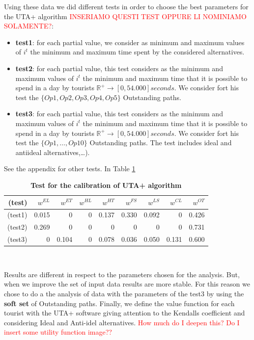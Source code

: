 \documentclass[a4paper]{article}
\begin{document}
Using these data we did different tests in order to choose the best parameters for the UTA+ algorithm \textcolor{red}{INSERIAMO QUESTI TEST OPPURE LI NOMINIAMO SOLAMENTE?}:
\begin{itemize}
    \item\textbf{test1}: for each partial value, we consider as minimum and maximum values of $i^t$ the minimum and maximum time spent by the considered alternatives.
    \item\textbf{test2}: for each partial value, this test considers as the minimum and maximum values of $i^t$ the minimum and maximum time that it is possible to spend in a day by tourists ${\mathbb{R}^+} \rightarrow [0,54.000] seconds$. We consider fort his test the $\{Op1, Op2, Op3, Op4, Op5\}$ Outstanding paths.
    \item\textbf{test3}: for each partial value, this test considers as the minimum and maximum values of $i^t$ the minimum and maximum time that it is possible to spend in a day by tourists ${\mathbb{R}^+} \rightarrow [0,54.000] seconds$. We consider fort his test the $\{Op1, \dots, Op10\}$ Outstanding paths. The test includes ideal and antiideal alternatives,\dots).
    \end{itemize}

 See the appendix for other tests.
 In Table \ref{Table4}


\begin{table}[ht]
\centering
\begin{tabular}{rrrrrrrrr}
  \hline
(test) & $w^{EL}$ & $w^{ET}$ & $w^{HL}$ & $w^{HT}$ & $w^{FS}$ & $w^{LS}$ & $w^{CL}$ & $w^{OT}$ \\
    \hline
(test1) & 0.015 & 0 & 0 & 0.137 & 0.330 & 0.092 & 0 & 0.426 \\
(test2) & 0.269 & 0 & 0 & 0 & 0 & 0 & 0 & 0.731 \\
(test3) & 0 & 0.104 & 0 & 0.078 & 0.036 & 0.050 & 0.131 & 0.600 \\
\hline
\end{tabular}
\caption{\textbf{Test for the calibration of UTA+ algorithm}}\
\label{Table4}
\end{table}

Results are different in respect to the parameters chosen for the analysis. But, when we improve the set of input data results are more stable. For this reason we chose to do a the analysis of data with the parameters of the test3 by using the \textbf{soft set} of Outstanding paths.
Finally, we define the value function for each tourist with the UTA+ software giving attention to the Kendalls coefficient and considering Ideal and Anti-idel alternatives.
\textcolor{red}{How much do I deepen this? Do I insert some utility function image??}
\end{document}
